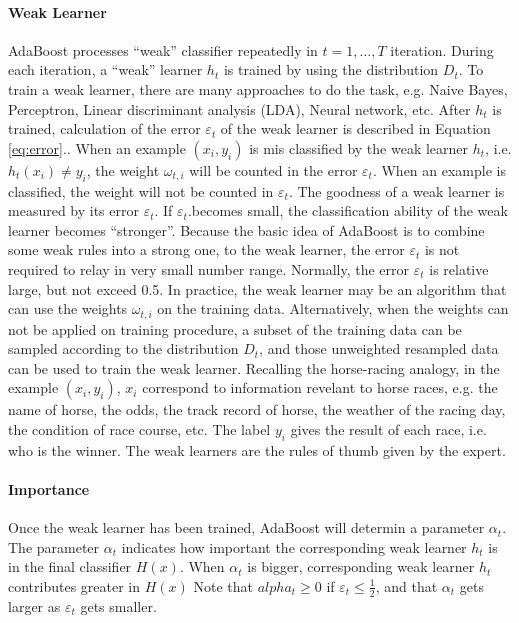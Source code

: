 \paragraph{Weak Learner}
AdaBoost processes ``weak'' classifier repeatedly in $t=1,\ldots,T$ iteration. During each iteration, a ``weak'' learner $h_{t}$ is trained by using the distribution $D_{t}$. To train a weak learner, there are many approaches to do the task, e.g. Naive Bayes\cite{Domingos1997}, Perceptron\cite{Rosenblatt1958}, Linear discriminant analysis (LDA)\cite{Martinez2001}, Neural network\cite{Riedmiller1993}, etc. After $h_{t}$ is trained, calculation of the error $\varepsilon_{t}$ of the weak learner is described in \mbox{Equation} \ref{eq:error}.. When an example $(x_{i},y_{i})$ is mis classified by the weak learner $h_{t}$, i.e. $h_{t}(x_{i})\neq y_{i}$, the weight  $\omega_{t,i}$ will be counted in the error $\varepsilon_{t}$. When an example is classified, the weight will not be counted in $\varepsilon_{t}$. The goodness of a weak learner is measured by its error $\varepsilon_{t}$. If $\varepsilon_{t}$.becomes small, the classification ability of the weak learner becomes ``stronger''. Because the basic idea of AdaBoost is to combine some weak rules into a strong one, to the weak learner, the error $\varepsilon_{t}$ is not required to relay in very small number range. Normally, the error $\varepsilon_{t}$ is relative large, but not exceed 0.5. In practice, the weak learner may be an algorithm that can use the weights $\omega_{t,i}$ on the training data. Alternatively, when the weights can not be applied on training procedure, a subset of the training data can be sampled according to the distribution $D_{t}$, and those unweighted resampled data can be used to train the weak learner. Recalling the horse-racing analogy, in the example $(x_{i},y_{i})$, $x_{i}$ correspond to information revelant to horse races, e.g. the name of horse, the odds, the track record of horse, the weather of the racing day, the condition of race course, etc.  The label $y_{i}$ gives the result of each race, i.e. who is the winner. The weak learners are the rules of thumb given by the expert. 

\paragraph{Importance}Once the weak learner has been trained, AdaBoost will determin a parameter $\alpha_{t}$. The parameter $\alpha_{t}$ indicates how important the corresponding weak learner $h_{t}$ is  in the final classifier $H(x)$. When $\alpha_{t}$ is bigger, corresponding weak learner $h_{t}$ contributes greater in $H(x)$  Note that $alpha_{t} \geq 0$ if $\varepsilon_{t} \leq \frac{1}{2}$, and that $\alpha_{t}$ gets larger as $\varepsilon_{t}$ gets smaller.

